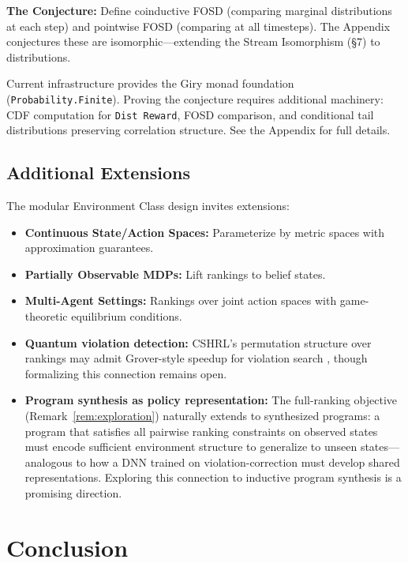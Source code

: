 \documentclass[9pt,a4paper]{article}
\theoremstyle{plain}
\theoremstyle{definition}
\theoremstyle{remark}
\begin{document}
\textbf{The Conjecture:} Define coinductive FOSD (comparing marginal distributions at each step) and pointwise FOSD (comparing at all timesteps). The Appendix conjectures these are isomorphic---extending the Stream Isomorphism (\S7) to distributions.

Current infrastructure provides the Giry monad foundation (\texttt{Probability.Finite}). Proving the conjecture requires additional machinery: CDF computation for \texttt{Dist Reward}, FOSD comparison, and conditional tail distributions preserving correlation structure. See the Appendix for full details.

\subsection{Additional Extensions}

The modular Environment Class design invites extensions:

\begin{itemize}
\item \textbf{Continuous State/Action Spaces:} Parameterize by metric spaces with approximation guarantees.
\item \textbf{Partially Observable MDPs:} Lift rankings to belief states.
\item \textbf{Multi-Agent Settings:} Rankings over joint action spaces with game-theoretic equilibrium conditions.
\item \textbf{Quantum violation detection:} CSHRL's permutation structure over rankings may admit Grover-style speedup for violation search \cite{Mutschler2022,Sannai2024}, though formalizing this connection remains open.
\item \textbf{Program synthesis as policy representation:} The full-ranking objective (Remark~\ref{rem:exploration}) naturally extends to synthesized programs: a program that satisfies all pairwise ranking constraints on observed states must encode sufficient environment structure to generalize to unseen states---analogous to how a DNN trained on violation-correction must develop shared representations.  Exploring this connection to inductive program synthesis is a promising direction.
\end{itemize}

\section{Conclusion}
\end{document}
